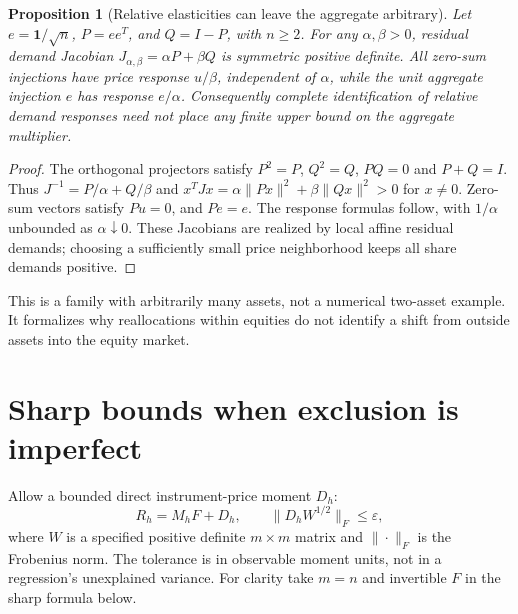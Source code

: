 \documentclass[11pt]{article}
\newtheorem{proposition}[theorem]{Proposition}
\theoremstyle{remark}
\begin{document}
\begin{proposition}[Relative elasticities can leave the aggregate arbitrary]
Let $e=\mathbf 1/\sqrt n$, $P=ee^T$, and $Q=I-P$, with $n\geq2$.
For any $\alpha,\beta>0$, residual demand Jacobian
$J_{\alpha,\beta}=\alpha P+\beta Q$ is symmetric positive definite.
All zero-sum injections have price response $u/\beta$, independent of
$\alpha$, while the unit aggregate injection $e$ has response $e/\alpha$.
Consequently complete identification of relative demand responses need
not place any finite upper bound on the aggregate multiplier.
\end{proposition}
\begin{proof}
The orthogonal projectors satisfy $P^2=P$, $Q^2=Q$, $PQ=0$ and
$P+Q=I$. Thus $J^{-1}=P/\alpha+Q/\beta$ and
$x^TJx=\alpha\|Px\|^2+\beta\|Qx\|^2>0$ for $x\ne0$.
Zero-sum vectors satisfy $Pu=0$, and $Pe=e$. The response formulas
follow, with $1/\alpha$ unbounded as $\alpha\downarrow0$. These
Jacobians are realized by local affine residual demands; choosing a
sufficiently small price neighborhood keeps all share demands positive.
\end{proof}
This is a family with arbitrarily many assets, not a numerical two-asset
example. It formalizes why reallocations within equities do not identify
a shift from outside assets into the equity market.

\section{Sharp bounds when exclusion is imperfect}
Allow a bounded direct instrument-price moment $D_h$:
\[
 R_h=M_hF+D_h,\qquad \|D_hW^{1/2}\|_F\leq\varepsilon,                \tag{2}
\]
where $W$ is a specified positive definite $m\times m$ matrix and
$\|\cdot\|_F$ is the Frobenius norm. The tolerance is in observable
moment units, not in a regression's unexplained variance.
For clarity take $m=n$ and invertible $F$ in the sharp formula below.
\end{document}
